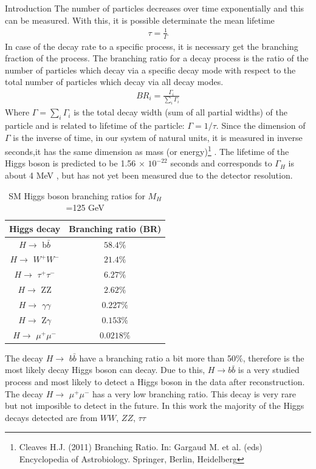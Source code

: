 \begin{chapter}{Introduction}
The number of particles decreases over time exponentially and this can be measured. With this, it is possible determinate the mean lifetime\cite{griff}
\begin{align}
\tau=\frac{1}{\Gamma}
\end{align}
In case of  the decay rate to a specific process, it is necessary get the branching fraction of the process. 
The branching ratio for a decay process is the ratio of the number of particles which decay via a specific decay mode with respect to the total number of particles which decay via all decay modes.
\begin{align}
BR_i =\frac{\Gamma_i}{\sum_{i}\Gamma_i}
\end{align}
Where $\Gamma=\sum_i\Gamma_i$ is the total decay width (sum of all partial widths) of the particle and is related to lifetime of the particle: $\Gamma=1/\tau$.
Since the dimension of $\Gamma$ is the inverse of time, in our system of natural units, it is measured in inverse seconds,it has the same dimension as mass (or energy)\footnote{Cleaves H.J. (2011) Branching Ratio. In: Gargaud M. et al. (eds) Encyclopedia of Astrobiology. Springer, Berlin, Heidelberg} . The lifetime of the Higgs boson is predicted to be 1.56 $\times$ $10^{-22}$ seconds and corresponds to $\Gamma_H$ is about 4 MeV , but has not yet been measured due to the detector resolution\cite{cms-manual}.
\\
\begin{table}[!htbp] 
\caption{SM Higgs boson branching ratios for  $M_H$ =125 GeV \protect \cite{pd}}
\centering
\begin{tabular}{|c|c|}
\hline
Higgs decay & Branching ratio (BR)\\
\hline
$H \rightarrow$ b$\bar{b}$ &$58.4\%$ \\
\hline
 $H \rightarrow$ $W^+W^-$ &$21.4\%$ \\
\hline
$H \rightarrow$ $\tau^+ \tau^-$ & $6.27\%$\\
\hline
$H \rightarrow$ ZZ &$2.62\%$\\
\hline
$H \rightarrow$ $\gamma\gamma$ &$0.227\%$\\
\hline
$H \rightarrow$ Z$\gamma$ &$0.153\%$\\
\hline
$H \rightarrow$ $\mu^+\mu^-$ &$0.0218\%$\\
\hline
\end{tabular}
\label{higgs1}
\end{table}
The decay  $H \rightarrow$ $b\bar{b}$ have a branching ratio a bit more than 50$\%$, therefore is the most likely decay Higgs boson can decay. Due to this,  $H\rightarrow b\bar{b}$ is a very studied process and most likely to detect a Higgs boson in the data after reconstruction. The decay  $H \rightarrow$ $\mu^+\mu^-$ has a very low branching ratio. This decay is very rare but not imposible to detect in the future.  In this work the majority of the Higgs decays detected are from $WW$, $ZZ$, $\tau \tau$\\


\end{chapter}
